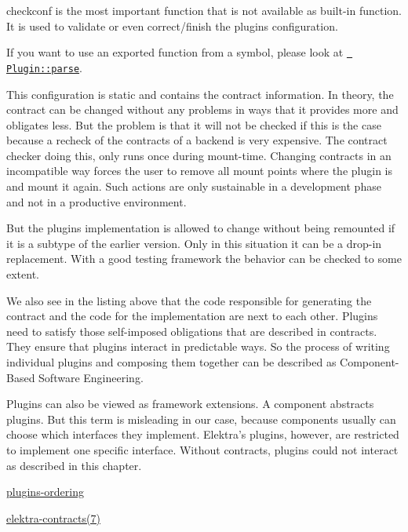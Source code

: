 \begin{DoxyCode}{0}
\end{DoxyCode}


{\ttfamily checkconf} is the most important function that is not available as built-\/in function. It is used to validate or even correct/finish the plugin\textquotesingle{}s configuration.

If you want to use an exported function from a symbol, please look at \href{/home/mpranj/workspace/libelektra/src/libs/tools/src/plugin.cpp}{\texttt{ Plugin\+::parse}}.

This configuration is static and contains the contract information. In theory, the contract can be changed without any problems in ways that it provides more and obligates less. But the problem is that it will not be checked if this is the case because a recheck of the contracts of a backend is very expensive. The contract checker doing this, only runs once during mount-\/time. Changing contracts in an incompatible way forces the user to remove all mount points where the plugin is and mount it again. Such actions are only sustainable in a development phase and not in a productive environment.

But the plugin\textquotesingle{}s implementation is allowed to change without being remounted if it is a subtype of the earlier version. Only in this situation it can be a drop-\/in replacement. With a good testing framework the behavior can be checked to some extent.

We also see in the listing above that the code responsible for generating the contract and the code for the implementation are next to each other. Plugins need to satisfy those self-\/imposed obligations that are described in contracts. They ensure that plugins interact in predictable ways. So the process of writing individual plugins and composing them together can be described as Component-\/\+Based Software Engineering.

Plugins can also be viewed as framework extensions. A component abstracts plugins. But this term is misleading in our case, because components usually can choose which interfaces they implement. Elektra’s plugins, however, are restricted to implement one specific interface. Without contracts, plugins could not interact as described in this chapter.


\begin{DoxyItemize}
\item \mbox{\hyperlink{doc_dev_plugins-ordering_md}{plugins-\/ordering}}
\item \mbox{\hyperlink{doc_help_elektra-contracts_md}{elektra-\/contracts(7)}} 
\end{DoxyItemize}